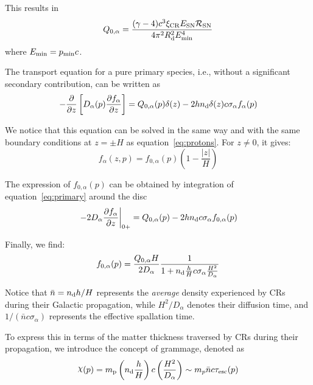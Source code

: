 {\color{red}This results in}
%
\begin{equation}
Q_{0,\alpha} = \frac{(\gamma - 4) c^3 \xi_{\rm CR} E_{\rm SN} \mathcal R_{\rm SN}}{4 \pi^2 R_{\rm d}^2 E_{\rm min}^4}
\end{equation}
%
where $E_{\rm min} = p_{\rm min} c$.

The transport equation for a pure primary species, i.e., without a significant secondary contribution, can be written as
%
\begin{equation}
-\frac{\partial}{\partial z} \left[ D_\alpha(p) \frac{\partial f_\alpha}{\partial z} \right] = Q_{0,\alpha}(p)\delta(z) - 2 h n_{\rm d} \delta (z) c \sigma_\alpha f_\alpha(p)
\label{eq:primary}
\end{equation}

We notice that this equation can be solved in the same way and with the same boundary conditions at $z = \pm H$ as equation~\eqref{eq:protons}. For $z \neq 0$, it gives:
%
\begin{equation}
f_\alpha(z,p) = f_{0,\alpha}(p) \left( 1 - \frac{|z|}{H} \right)
\end{equation}

The expression of $f_{0,\alpha}(p)$ can be obtained by integration of equation~\eqref{eq:primary} around the disc
%
\begin{equation}
\left. -2 D_\alpha \frac{\partial f_\alpha}{\partial z} \right|_{0+} = Q_{0,\alpha}(p) - 2 h n_{\rm d} c \sigma_{\alpha} f_{0,\alpha}(p)
\end{equation}

Finally, we find:
%
\begin{equation}
f_{0,\alpha}(p) = \frac{Q_{0,\alpha} H}{2D_\alpha} \frac{1}{1 + n_{\rm d} \frac{h}{H} c \sigma_{\alpha} \frac{H^2}{D_\alpha}}
\end{equation}

Notice that $\bar n = n_{\rm d} h/H$ represents the \emph{average} density experienced by CRs during their Galactic propagation, while $H^2/D_\alpha$ denotes their diffusion time, and $1/(\bar n c \sigma_\alpha)$ represents the effective spallation time.

To express this in terms of the matter thickness traversed by CRs during their propagation, we introduce the concept of grammage, denoted as 
%
\begin{equation}
\rchi(p) = m_{\rm p} \left( n_{\rm d} \frac{h}{H} \right) c \left( \frac{H^2}{D_\alpha} \right) \sim m_p \bar n c \tau_{\rm esc}(p)
\label{eq:grammage}
\end{equation}


